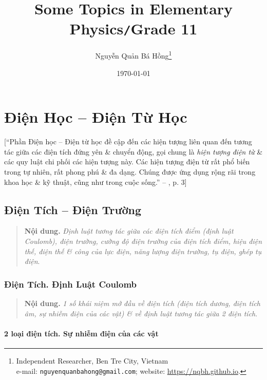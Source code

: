 \documentclass[oneside]{book}
\title{Some Topics in Elementary Physics\texttt{/}Grade 11}
\author{Nguyễn Quản Bá Hồng\footnote{Independent Researcher, Ben Tre City, Vietnam\\e-mail: \texttt{nguyenquanbahong@gmail.com}; website: \url{https://nqbh.github.io}.}}
\date{\today}
\numberwithin{equation}{section}
\begin{document}
\frontmatter
\maketitle
\setcounter{secnumdepth}{4}
\setcounter{tocdepth}{3}
\tableofcontents
\newpage


\mainmatter
\part{Điện Học -- Điện Từ Học}
[``Phần Điện học -- Điện từ học đề cập đến các hiện tượng liên quan đến tương tác giữa các điện tích đứng yên \& chuyển động, gọi chung là \textit{hiện tượng điện từ} \& các quy luật chi phối các hiện tượng này. Các hiện tượng điện từ rất phổ biến trong tự nhiên, rất phong phú \& đa dạng. Chúng được ứng dụng rộng rãi trong khoa học \& kỹ thuật, cũng như trong cuộc sống.'' -- \cite{SGK_Vat_Ly_11_nang_cao}, p. 3]

\chapter{Điện Tích -- Điện Trường}

\begin{quotation}
	\textbf{Nội dung.} \textit{Định luật tương tác giữa các điện tích điểm (định luật Coulomb), điện trường, cường độ điện trường của điện tích điểm, hiệu điện thế, điện thế \& công của lực điện, năng lượng điện trường, tụ điện, ghép tụ điện}.
\end{quotation}

\section{Điện Tích. Định Luật Coulomb}
\begin{quotation}
	\textbf{Nội dung.} \textit{1 số khái niệm mở đầu về điện tích (điện tích dương, điện tích âm, sự nhiễm điện của các vật) \& về định luật tương tác giữa 2 điện tích}.
\end{quotation}

\subsection{2 loại điện tích. Sự nhiễm điện của các vật}
\end{document}
